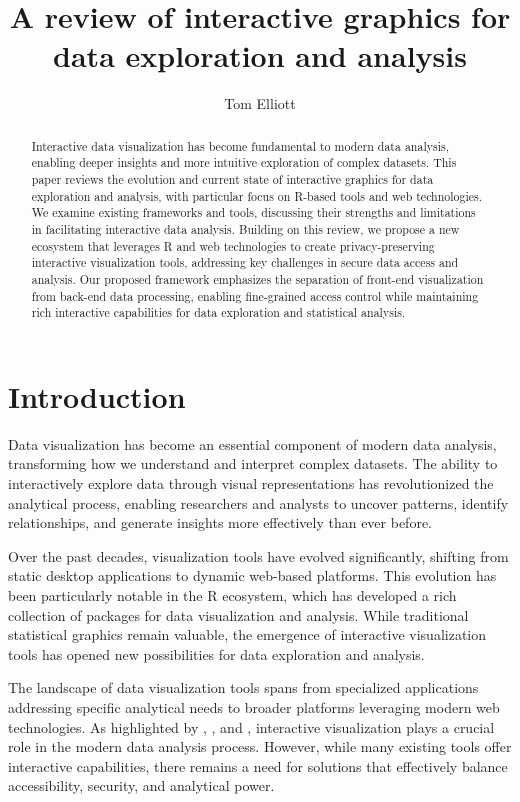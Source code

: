 \documentclass{article}
\title{A review of interactive graphics for data exploration and analysis}
\author{Tom Elliott}
\affil{\small iNZight Analytics Ltd\\
Iwi affiliations: Ngāti Whakaue, Ngāti Raukawa}
\date{}
\begin{document}
\maketitle

\begin{abstract}
Interactive data visualization has become fundamental to modern data analysis, enabling deeper insights and more intuitive exploration of complex datasets. This paper reviews the evolution and current state of interactive graphics for data exploration and analysis, with particular focus on R-based tools and web technologies. We examine existing frameworks and tools, discussing their strengths and limitations in facilitating interactive data analysis. Building on this review, we propose a new ecosystem that leverages R and web technologies to create privacy-preserving interactive visualization tools, addressing key challenges in secure data access and analysis. Our proposed framework emphasizes the separation of front-end visualization from back-end data processing, enabling fine-grained access control while maintaining rich interactive capabilities for data exploration and statistical analysis.
\end{abstract}

\section{Introduction}
\label{sec:intro}

Data visualization has become an essential component of modern data analysis, transforming how we understand and interpret complex datasets. The ability to interactively explore data through visual representations has revolutionized the analytical process, enabling researchers and analysts to uncover patterns, identify relationships, and generate insights more effectively than ever before.

Over the past decades, visualization tools have evolved significantly, shifting from static desktop applications to dynamic web-based platforms. This evolution has been particularly notable in the R ecosystem, which has developed a rich collection of packages for data visualization and analysis. While traditional statistical graphics remain valuable, the emergence of interactive visualization tools has opened new possibilities for data exploration and analysis.

The landscape of data visualization tools spans from specialized applications addressing specific analytical needs to broader platforms leveraging modern web technologies. As highlighted by \cite{Cook2007}, \cite{Theus2014}, and \cite{Ward2015}, interactive visualization plays a crucial role in the modern data analysis process. However, while many existing tools offer interactive capabilities, there remains a need for solutions that effectively balance accessibility, security, and analytical power.
\end{document}
